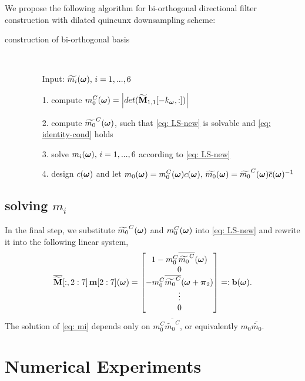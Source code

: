 We propose the following algorithm for bi-orthogonal directional filter construction with dilated quincunx downsampling scheme:
\begin{description}%
\item[construction of bi-orthogonal basis]\
\begin{itemize}
\item[Input:] $\widetilde{m_{i}}(\boldsymbol{\omega}),\,i=1,...,6$
\item[1.] compute $m_0^C(\boldsymbol{\omega}) = \left|det(\widetilde{\mathbf{M}}_{1,1}[-k_{\boldsymbol{\omega}},:])\right|$
\item[2.] compute $\widetilde{m_{0}}^C(\boldsymbol{\omega})$, such that \eqref{eq: LS-new} is solvable and \eqref{eq: identity-cond} holds
\item[3.] solve $m_i(\boldsymbol{\omega}),\, i=1,...,6$ according to \eqref{eq: LS-new}
\item[4.] design $c(\boldsymbol{\omega})$ and let $m_0(\boldsymbol{\omega}) = m_0^C(\boldsymbol{\omega})c(\boldsymbol{\omega}),\,\widetilde{m_{0}}(\boldsymbol{\omega}) = \widetilde{m_{0}}^C(\boldsymbol{\omega})\overline{c}(\boldsymbol{\omega})^{-1}$
\end{itemize}
\end{description}



\subsection{solving $m_i$}
In the final step, we substitute $\widetilde{m_{0}}^C(\boldsymbol{\omega})$ and $m_0^C(\boldsymbol{\omega})$ into \eqref{eq: LS-new} and rewrite it into the following linear system,
\begin{align}\label{eq: mi}
\overline{\widetilde{\mathbf{M}}}[:,2:7]\,\mathbf{m}[2:7](\boldsymbol{\omega}) = 
\begin{bmatrix}
1-m_0^C\overline{\widetilde{m_0}^C}(\boldsymbol{\omega})\\
0\\
-m_0^C\overline{\widetilde{m_0}^C}(\boldsymbol{\omega}+\boldsymbol{\pi}_2)\\
\vdots \\
0
\end{bmatrix}
=:\mathbf{b}(\boldsymbol{\omega}).
\end{align}
The solution of \eqref{eq: mi} depends only on $m_0^C\overline{\widetilde{m_0}^C}$, or equivalently $m_0\overline{\widetilde{m_0}}$. 


\section{Numerical Experiments}
